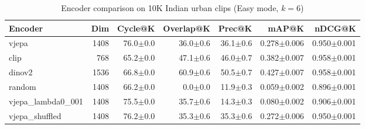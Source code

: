 \begin{table}[ht]
\centering
\caption{Encoder comparison on 10K Indian urban clips (Easy mode, $k=6$)}
\label{tab:encoder_comparison}
\begin{tabular}{lrrrrrr}
\toprule
Encoder & Dim & Cycle@K & Overlap@K & Prec@K & mAP@K & nDCG@K \\
\midrule
vjepa & 1408 & 76.0{\tiny$\pm$0.0} & 36.0{\tiny$\pm$0.6} & 36.1{\tiny$\pm$0.6} & 0.278{\tiny$\pm$0.006} & 0.950{\tiny$\pm$0.001} \\
clip & 768 & 65.2{\tiny$\pm$0.0} & 47.1{\tiny$\pm$0.6} & 46.0{\tiny$\pm$0.7} & 0.382{\tiny$\pm$0.007} & 0.958{\tiny$\pm$0.001} \\
dinov2 & 1536 & 66.8{\tiny$\pm$0.0} & 60.9{\tiny$\pm$0.6} & 50.5{\tiny$\pm$0.7} & 0.427{\tiny$\pm$0.007} & 0.958{\tiny$\pm$0.001} \\
random & 1408 & 66.2{\tiny$\pm$0.0} & 0.0{\tiny$\pm$0.0} & 11.9{\tiny$\pm$0.3} & 0.059{\tiny$\pm$0.002} & 0.896{\tiny$\pm$0.001} \\
vjepa\_lambda0\_001 & 1408 & 75.5{\tiny$\pm$0.0} & 35.7{\tiny$\pm$0.6} & 14.3{\tiny$\pm$0.3} & 0.080{\tiny$\pm$0.002} & 0.906{\tiny$\pm$0.001} \\
vjepa\_shuffled & 1408 & 76.2{\tiny$\pm$0.0} & 35.3{\tiny$\pm$0.6} & 35.3{\tiny$\pm$0.6} & 0.272{\tiny$\pm$0.006} & 0.950{\tiny$\pm$0.001} \\
\bottomrule
\end{tabular}
\end{table}